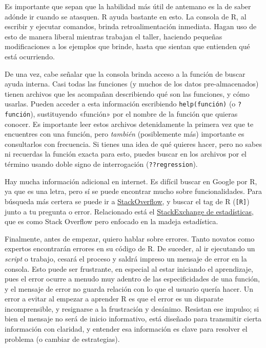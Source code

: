 \documentclass[
]{article}
\begin{document}
Es importante que sepan que la habilidad más útil de antemano es la de
saber adónde ir cuando se atasquen. R ayuda bastante en esto. La consola
de R, al escribir y ejecutar comandos, brinda retroalimentación
inmediata. Hagan uso de esto de manera liberal mientras trabajan el
taller, haciendo pequeñas modificaciones a los ejemplos que brinde,
hasta que sientan que entienden qué está ocurriendo.

De una vez, cabe señalar que la consola brinda acceso a la función de
buscar ayuda interna. Casi todas las funciones (y muchos de los datos
pre-almacenados) tienen archivos que les acompañan describiendo qué son
las funciones, y cómo usarlas. Pueden acceder a esta información
escribiendo \texttt{help(función)} (o \texttt{?función}), sustituyendo
«función» por el nombre de la función que quieras conocer. Es importante
leer estos archivos detenidamente la primera vez que te encuentres con
una función, pero \emph{también} (posiblemente más) importante es
consultarlos con frecuencia. Si tienes una idea de qué quieres hacer,
pero no sabes ni recuerdas la función exacta para esto, puedes buscar en
los archivos por el término usando doble signo de interrogación
(\texttt{??regression}).

Hay mucha información adicional en internet. Es difícil buscar en Google
por R, ya que es una letra, pero sí se puede encontrar mucho sobre
funcionalidades. Para búsqueda más certera se puede ir a
\href{http://stackoverflow.com/}{StackOverflow}, y buscar el tag de R
(\texttt{{[}R{]}}) junto a tu pregunta o error. Relacionado está el
\href{http://stats.stackexchange.com/}{StackExchange de estadísticas},
que es como Stack Overflow pero enfocado en la madeja estadística.

Finalmente, antes de empezar, quiero hablar sobre errores. Tanto novatos
como expertos encontrarán errores en su código de R. De suceder, al ir
ejecutando un \emph{script} o trabajo, cesará el proceso y saldrá
impreso un mensaje de error en la consola. Esto puede ser frustrante, en
especial al estar iniciando el aprendizaje, pues el error ocurre a
menudo muy adentro de las especificidades de una función, y el mensaje
de error no guarda relación con lo que el usuario quería hacer. Un error
a evitar al empezar a aprender R es que el error es un disparate
incomprensible, y resignarse a la frustración y desánimo. Resistan ese
impulso; si bien el mensaje no será de inicio informativo, está diseñado
para transmitir cierta información con claridad, y entender esa
información es clave para resolver el problema (o cambiar de
estrategias).
\end{document}
